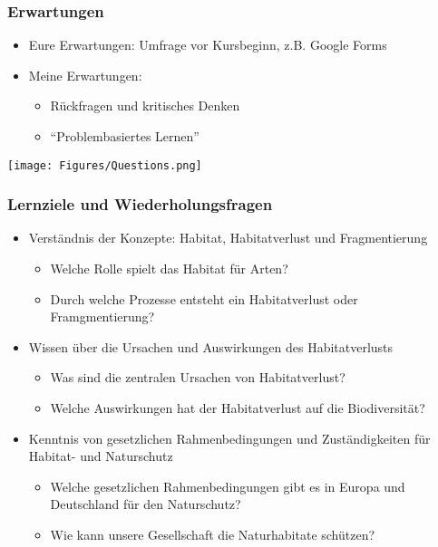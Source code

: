 \documentclass{beamer}
\begin{document}

\begin{frame}
  \frametitle{Erwartungen}
\begin{itemize}
\item \alert{Eure Erwartungen:} Umfrage vor Kursbeginn, z.B. Google Forms
\item \alert{Meine Erwartungen:}
\begin{itemize}
\item Rückfragen und kritisches Denken
\item “Problembasiertes Lernen”
\end{itemize}
\end{itemize}
\raggedleft
\texttt{[image: Figures/Questions.png]}
\end{frame}


\begin{frame}
  \frametitle{Lernziele und Wiederholungsfragen}
\begin{itemize}
\item Verständnis der Konzepte: Habitat, Habitatverlust und Fragmentierung
	\begin{itemize}
	\item Welche Rolle spielt das Habitat für Arten?
	\item Durch welche Prozesse entsteht ein Habitatverlust oder Framgmentierung?
	\end{itemize}
\item Wissen über die Ursachen und Auswirkungen des Habitatverlusts
	\begin{itemize}
	\item Was sind die zentralen Ursachen von Habitatverlust?
	\item Welche Auswirkungen hat der Habitatverlust auf die Biodiversität?
	\end{itemize}
\item Kenntnis von gesetzlichen Rahmenbedingungen und Zuständigkeiten für Habitat- und Naturschutz
	\begin{itemize}
	\item Welche gesetzlichen Rahmenbedingungen gibt es in Europa und Deutschland für den Naturschutz?
	\item Wie kann unsere Gesellschaft die Naturhabitate schützen?
	\end{itemize}
\end{itemize}
\end{frame}
\end{document}
